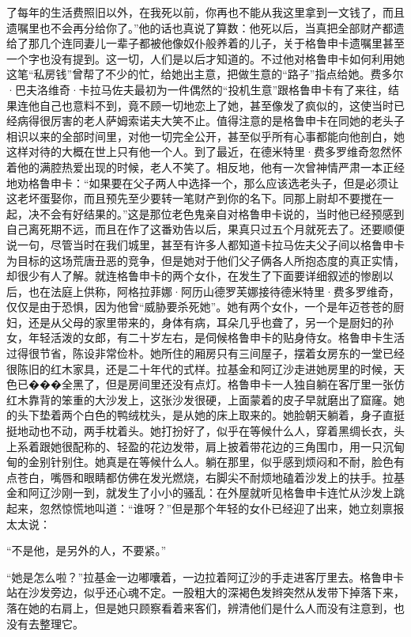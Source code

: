 了每年的生活费照旧以外，在我死以前，你再也不能从我这里拿到一文钱了，而且遗嘱里也不会再分给你了。”他的话也真说了算数：他死以后，当真把全部财产都遗给了那几个连同妻儿一辈子都被他像奴仆般养着的儿子，关于格鲁申卡遗嘱里甚至一个字也没有提到。这一切，人们是以后才知道的。不过他对格鲁申卡如何利用她这笔“私房钱”曾帮了不少的忙，给她出主意，把做生意的“路子”指点给她。费多尔·巴夫洛维奇·卡拉马佐夫最初为一件偶然的“投机生意”跟格鲁申卡有了来往，结果连他自己也意料不到，竟不顾一切地恋上了她，甚至像发了疯似的，这使当时已经病得很厉害的老人萨姆索诺夫大笑不止。值得注意的是格鲁申卡在同她的老头子相识以来的全部时间里，对他一切完全公开，甚至似乎所有心事都能向他剖白，她这样对待的大概在世上只有他一个人。到了最近，在德米特里·费多罗维奇忽然怀着他的满腔热爱出现的时候，老人不笑了。相反地，他有一次曾神情严肃一本正经地劝格鲁申卡：“如果要在父子两人中选择一个，那么应该选老头子，但是必须让这老坏蛋娶你，而且预先至少要转一笔财产到你的名下。同那上尉却不要搅在一起，决不会有好结果的。”这是那位老色鬼亲自对格鲁申卡说的，当时他已经预感到自己离死期不远，而且在作了这番劝告以后，果真只过五个月就死去了。还要顺便说一句，尽管当时在我们城里，甚至有许多人都知道卡拉马佐夫父子间以格鲁申卡为目标的这场荒唐丑恶的竞争，但是她对于他们父子俩各人所抱态度的真正实情，却很少有人了解。就连格鲁申卡的两个女仆，在发生了下面要详细叙述的惨剧以后，也在法庭上供称，阿格拉菲娜·阿历山德罗芙娜接待德米特里·费多罗维奇，仅仅是由于恐惧，因为他曾“威胁要杀死她”。她有两个女仆，一个是年迈苍苍的厨妇，还是从父母的家里带来的，身体有病，耳朵几乎也聋了，另一个是厨妇的孙女，年轻活泼的女郎，有二十岁左右，是伺候格鲁申卡的贴身侍女。格鲁申卡生活过得很节省，陈设非常俭朴。她所住的厢房只有三间屋子，摆着女房东的一堂已经很陈旧的红木家具，还是二十年代的式样。拉基金和阿辽沙走进她房里的时候，天色已���全黑了，但是房间里还没有点灯。格鲁申卡一人独自躺在客厅里一张仿红木靠背的笨重的大沙发上，这张沙发很硬，上面蒙着的皮子早就磨出了窟窿。她的头下垫着两个白色的鸭绒枕头，是从她的床上取来的。她脸朝天躺着，身子直挺挺地动也不动，两手枕着头。她打扮好了，似乎在等候什么人，穿着黑绸长衣，头上系着跟她很配称的、轻盈的花边发带，肩上披着带花边的三角围巾，用一只沉甸甸的金别针别住。她真是在等候什么人。躺在那里，似乎感到烦闷和不耐，脸色有点苍白，嘴唇和眼睛都仿佛在发光燃烧，右脚尖不耐烦地磕着沙发上的扶手。拉基金和阿辽沙刚一到，就发生了小小的骚乱：在外屋就听见格鲁申卡连忙从沙发上跳起来，忽然惊慌地叫道：“谁呀？”但是那个年轻的女仆已经迎了出来，她立刻禀报太太说：
\par “不是他，是另外的人，不要紧。”
\par “她是怎么啦？”拉基金一边嘟囔着，一边拉着阿辽沙的手走进客厅里去。格鲁申卡站在沙发旁边，似乎还心魂不定。一股粗大的深褐色发辫突然从发带下掉落下来，落在她的右肩上，但是她只顾察看着来客们，辨清他们是什么人而没有注意到，也没有去整理它。
